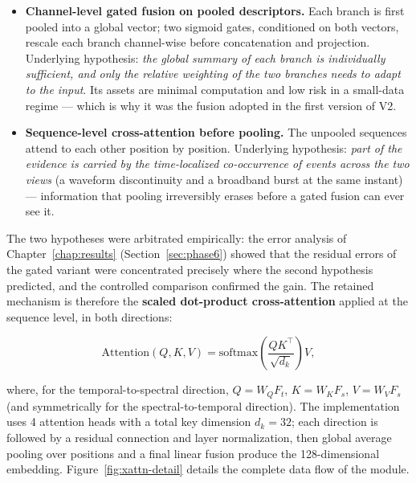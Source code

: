 \begin{itemize}[itemsep=2pt]
    \item \textbf{Channel-level gated fusion on pooled descriptors.} Each branch is first pooled into a global vector; two sigmoid gates, conditioned on both vectors, rescale each branch channel-wise before concatenation and projection. Underlying hypothesis: \emph{the global summary of each branch is individually sufficient, and only the relative weighting of the two branches needs to adapt to the input}. Its assets are minimal computation and low risk in a small-data regime --- which is why it was the fusion adopted in the first version of V2.
    \item \textbf{Sequence-level cross-attention before pooling.} The unpooled sequences attend to each other position by position. Underlying hypothesis: \emph{part of the evidence is carried by the time-localized co-occurrence of events across the two views} (a waveform discontinuity and a broadband burst at the same instant) --- information that pooling irreversibly erases before a gated fusion can ever see it.
\end{itemize}

The two hypotheses were arbitrated empirically: the error analysis of Chapter~\ref{chap:results} (Section~\ref{sec:phase6}) showed that the residual errors of the gated variant were concentrated precisely where the second hypothesis predicted, and the controlled comparison confirmed the gain. The retained mechanism is therefore the \textbf{scaled dot-product cross-attention} \cite{vaswani2017attention} applied at the sequence level, in both directions:

\begin{equation}
\text{Attention}(Q, K, V) = \mathrm{softmax}\!\left(\frac{QK^{\top}}{\sqrt{d_k}}\right) V,
\label{eq:attention}
\end{equation}

where, for the temporal-to-spectral direction, $Q = W_Q F_t$, $K = W_K F_s$, $V = W_V F_s$ (and symmetrically for the spectral-to-temporal direction). The implementation uses 4 attention heads with a total key dimension $d_k = 32$; each direction is followed by a residual connection and layer normalization, then global average pooling over positions and a final linear fusion produce the 128-dimensional embedding. Figure~\ref{fig:xattn-detail} details the complete data flow of the module.

